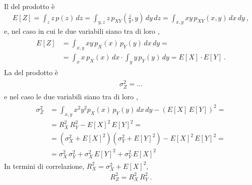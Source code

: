 \documentclass[letterpaper,10pt,italian]{jupyterBook}
\begin{document}
\sphinxAtStartPar
Il  del prodotto è
\begin{equation*}
\begin{split}E[Z] = \int_z z \, p(z) \, dz = \int_{y,z} z \, p_{XY}\left(\frac{z}{y},y\right) \, dy \, dz =  \int_{x,y} x y \, p_{XY}(x,y) \, dx \, dy \ , \end{split}
\end{equation*}
\sphinxAtStartPar
e, nel caso in cui le due variabili siano tra di loro ,
\begin{equation*}
\begin{split}\begin{aligned}
  E[Z]
  & = \int_{x,y} x y \, p_X(x) \, p_Y(y) \, dx \, dy = \\
  & = \int_{x} x \, p_X(x) \, dx \cdot \int_y y \, p_Y(y) \, dy = E[X] \cdot E[Y] \ .
\end{aligned}\end{split}
\end{equation*}
\sphinxAtStartPar
La  del prodotto è
\begin{equation*}
\begin{split}\begin{aligned}
  \sigma_Z^2 = ...
\end{aligned}\end{split}
\end{equation*}
\sphinxAtStartPar
e nel caso le due variabili siano tra di loro ,
\begin{equation*}
\begin{split}\begin{aligned}
  \sigma_Z^2 
  & = \int_{x,y} x^2 y^2 p_X(x) \, p_Y(y) \, dx \, dy - \left( E[X] \, E[Y] \right)^2 = \\
  & = R_X^2 \, R_Y^2 - E[X]^2 \, E[Y]^2 = \\
  & = \left( \sigma_X^2 + E[X]^2 \right)\left( \sigma_Y^2 + E[Y]^2 \right) - E[X]^2 \, E[Y]^2 = \\
  & = \sigma_X^2 \, \sigma_Y^2 + \sigma_X^2 \, E[Y]^2 + \sigma_Y^2 \, E[X]^2
\end{aligned}\end{split}
\end{equation*}
\sphinxAtStartPar
In termini di correlazione, \(R_X^2 = \sigma_X^2 + E[X]^2\),
\begin{equation*}
\begin{split}R_Z^2 = R_X^2 \, R_Y^2 \ .\end{split}
\end{equation*}
\sphinxstepscope
\end{document}

